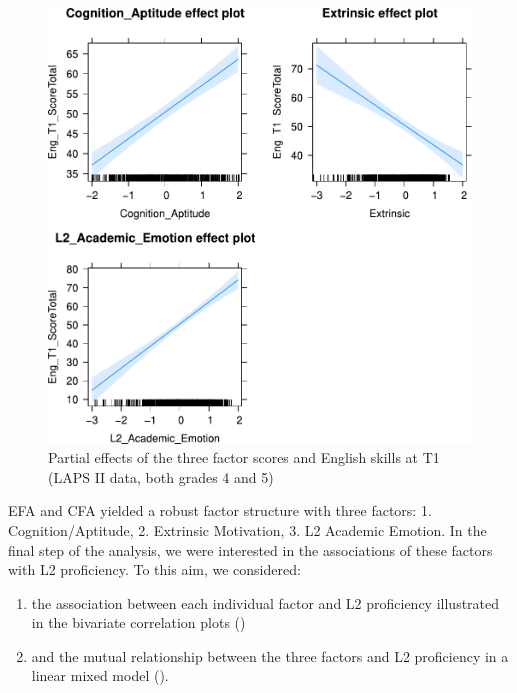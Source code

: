 \documentclass[output=paper]{langsci/langscibook}
\begin{document}
\begin{figure}
\includegraphics[width=.75\textwidth]{figures/Figure3.3.pdf}
\caption{\label{fig:03:3}Partial effects of the three factor scores and English skills at T1 (LAPS II data, both grades 4 and 5)}
\end{figure}


EFA and CFA yielded a robust factor structure with three factors: 1. Cognition/Aptitude, 2. Extrinsic Motivation, 3. L2 Academic Emotion. In the final step of the analysis, we were interested in the associations of these factors with L2 proficiency. To this aim, we considered:

\begin{enumerate}
\item the association between each individual factor and L2 proficiency illustrated in the bivariate correlation plots ()
\item and the mutual relationship between the three factors and L2 proficiency in a linear mixed model ().
\end{enumerate}
\end{document}
